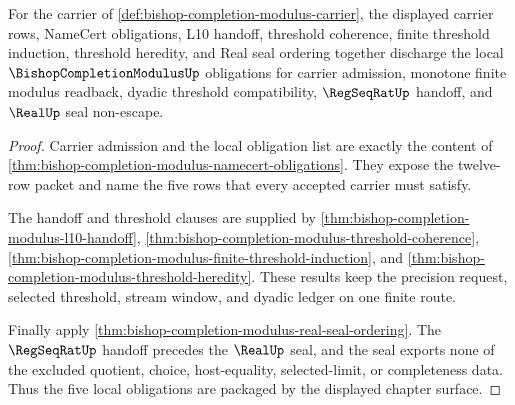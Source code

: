 \begin{theorem}
\label{thm:bishop-completion-modulus-obligation-package}
For the carrier of \autoref{def:bishop-completion-modulus-carrier}, the displayed carrier rows, NameCert obligations, L10 handoff, threshold coherence, finite threshold induction, threshold heredity, and Real seal ordering together discharge the local $\BishopCompletionModulusUp$ obligations for carrier admission, monotone finite modulus readback, dyadic threshold compatibility, $\RegSeqRatUp$ handoff, and $\RealUp$ seal non-escape.
\end{theorem}
\begin{proof}
Carrier admission and the local obligation list are exactly the content of \autoref{thm:bishop-completion-modulus-namecert-obligations}. They expose the twelve-row packet and name the five rows that every accepted carrier must satisfy.

The handoff and threshold clauses are supplied by \autoref{thm:bishop-completion-modulus-l10-handoff}, \autoref{thm:bishop-completion-modulus-threshold-coherence}, \autoref{thm:bishop-completion-modulus-finite-threshold-induction}, and \autoref{thm:bishop-completion-modulus-threshold-heredity}. These results keep the precision request, selected threshold, stream window, and dyadic ledger on one finite route.

Finally apply \autoref{thm:bishop-completion-modulus-real-seal-ordering}. The $\RegSeqRatUp$ handoff precedes the $\RealUp$ seal, and the seal exports none of the excluded quotient, choice, host-equality, selected-limit, or completeness data. Thus the five local obligations are packaged by the displayed chapter surface.
\end{proof}

